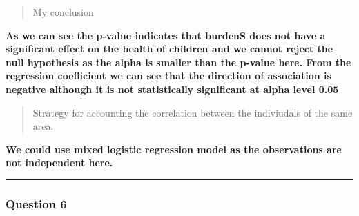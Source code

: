 \documentclass[
]{article}
\begin{document}
\begin{quote}
My conclusion
\end{quote}

\textbf{As we can see the p-value indicates that burdenS does not have a
significant effect on the health of children and we cannot reject the
null hypothesis as the alpha is smaller than the p-value here. From the
regression coefficient we can see that the direction of association is
negative although it is not statistically significant at alpha level
0.05 }

\begin{quote}
Strategy for accounting the correlation between the indiviudals of the
same area.
\end{quote}

\textbf{We could use mixed logistic regression model as the observations
are not independent here.}

\begin{center}\rule{0.5\linewidth}{0.5pt}\end{center}

\hypertarget{question-6}{%
\subsubsection{Question 6}\label{question-6}}
\end{document}
